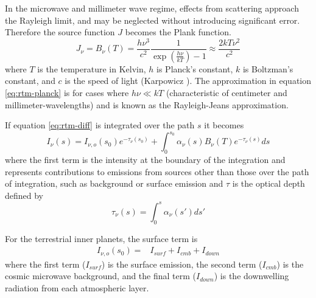 In the microwave and millimeter wave regime, effects from scattering approach the Rayleigh limit, and may be neglected without introducing significant error. Therefore the source function $J$ becomes the Plank function.
\begin{equation}\label{eq:rtm-planck}
J_\nu = B_\nu(T) = \frac{h\nu^3}{c^2} \frac{1}{\exp(\frac{h\nu}{kT})-1} \approx \frac{2kT\nu^2}{c^2}
\end{equation}
where $T$ is the temperature in Kelvin, $h$ is Planck's constant, $k$ is Boltzman's constant, and $c$ is the speed of light (Karpowicz \cite{Karpowicz-thesis}). The approximation in equation \ref{eq:rtm-planck} is for cases where $h\nu \ll kT$ (characteristic of centimeter and millimeter-wavelengths) and is known as the Rayleigh-Jeans approximation. %

If equation \ref{eq:rtm-diff} is integrated over the path $s$ it becomes
\begin{equation}\label{eq:rtm-integrated}
I_\nu(s) = I_{\nu,o}(s_0)e^{-\tau_\nu(s_0)}+\int_0^{s_0} \alpha_\nu(s)B_\nu(T) e^{-\tau_\nu(s)}ds 
\end{equation}
where the first term is the intensity at the boundary of the integration and represents contributions to emissions from sources other than those over the path of integration, such as background or surface emission and $\tau$ is the optical depth defined by
\begin{equation}\label{eq:rtm-tau}
\tau_\nu(s) = \int_0^s \alpha_\nu(s') ds'
\end{equation}

For the terrestrial inner planets, the surface term is 
\begin{equation}\label{eq:rtm-surface-term}
\begin{split}
I_{\nu,o}(s_0) =& I_{surf} + I_{cmb}+ I_{down}
\end{split}
\end{equation}
where the first term ($I_{surf}$) is the surface emission, the second term ($I_{cmb}$) is the cosmic microwave background, and the final term ($I_{down}$) is the downwelling radiation from each atmospheric layer. 

